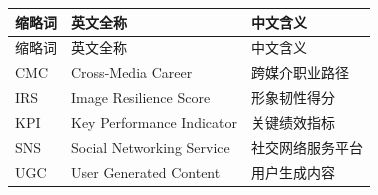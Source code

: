 \begingroup
{}
\renewcommand{\arraystretch}{1.45}
\begin{longtable}{p{}p{}p{}}
\toprule
缩略词 & 英文全称 & 中文含义 \\
\midrule
\endfirsthead
\toprule
缩略词 & 英文全称 & 中文含义 \\
\midrule
\endhead
CMC & Cross-Media Career & 跨媒介职业路径 \\
IRS & Image Resilience Score & 形象韧性得分 \\
KPI & Key Performance Indicator & 关键绩效指标 \\
SNS & Social Networking Service & 社交网络服务平台 \\
UGC & User Generated Content & 用户生成内容 \\
\bottomrule
\end{longtable}
\endgroup
